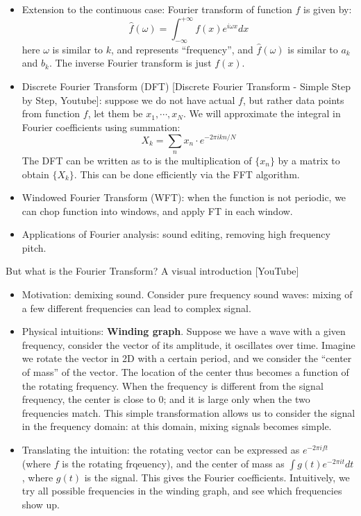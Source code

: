 \documentclass{report}
\begin{document}
\begin{itemize}
	\item Extension to the continuous case: Fourier transform of function $f$ is given by: 
	\begin{equation}
	\hat{f}(\omega)  = \int_{-\infty}^{+\infty} f(x) e^{i\omega x} dx
	\end{equation} 
	here $\omega$ is similar to $k$, and represents ``frequency'', and $\hat{f}(\omega)$ is similar to $a_k$ and $b_k$. The inverse Fourier transform is just $f(x)$. 
	
	\item Discrete Fourier Transform (DFT) [Discrete Fourier Transform - Simple Step by Step, Youtube]: suppose we do not have actual $f$, but rather data points from function $f$, let them be $x_1, \cdots, x_N$. We will approximate the integral in Fourier coefficients using summation: 
	\begin{equation}
	X_k = \sum_n x_n \cdot e^{-2 \pi i k n / N}
	\end{equation}
	The DFT can be written as to is the multiplication of $\{x_n\}$ by a matrix to obtain $\{X_k\}$. This can be done efficiently via the FFT algorithm. 
	
	\item Windowed Fourier Transform (WFT): when the function is not periodic, we can chop function into windows, and apply FT in each window.  
	
	\item Applications of Fourier analysis: sound editing, removing high frequency pitch. 
\end{itemize}

But what is the Fourier Transform? A visual introduction [YouTube]
\begin{itemize}
	\item Motivation: demixing sound. Consider pure frequency sound waves: mixing of a few different frequencies can lead to complex signal. 
	
	\item Physical intuitions: \textbf{Winding graph}. Suppose we have a wave with a given frequency, consider the vector of its amplitude, it oscillates over time. Imagine we rotate the vector in 2D with a certain period, and we consider the ``center of mass'' of the vector. The location of the center thus becomes a function of the rotating frequency. When the frequency is different from the signal frequency, the center is close to 0; and it is large only when the two frequencies match. This simple transformation allows us to consider the signal in the frequency domain: at this domain, mixing signals becomes simple.  
	
	\item Translating the intuition: the rotating vector can be expressed as $e^{-2\pi i f t}$ (where $f$ is the rotating frqeuency), and the center of mass as $\int g(t) e^{-2\pi i t} dt$, where $g(t)$ is the signal. This gives the Fourier coefficients. Intuitively, we try all possible frequencies in the winding graph, and see which frequencies show up. 
\end{itemize}
\end{document}
